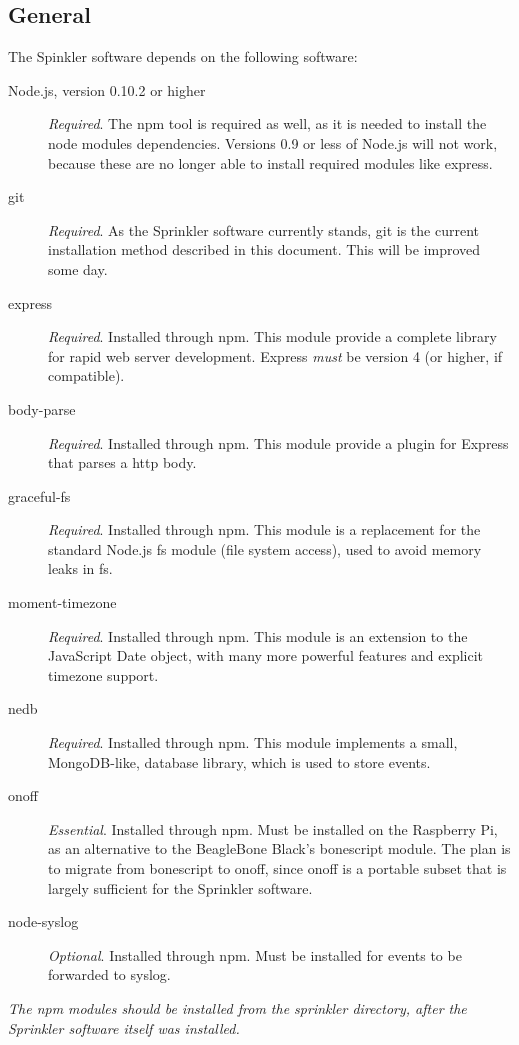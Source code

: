 \documentclass[11pt]{book}
\begin{document}
\subsection{General}
The Spinkler software depends on the following software:
\begin{description}
\item[Node.js, version 0.10.2 or higher] \emph{Required}. The npm tool is required as well, as it is needed to install the node modules dependencies. Versions 0.9 or less of Node.js will not work, because these are no longer able to install required modules like express.
\item[git] \emph{Required}. As the Sprinkler software currently stands, git is the current installation method described in this document. This will be improved some day.
\item[express] \emph{Required}. Installed through npm. This module provide a complete library for rapid web server development. Express \emph{must} be version 4 (or higher, if compatible).
\item[body-parse] \emph{Required}. Installed through npm. This module provide a plugin for Express that parses a http body.
\item[graceful-fs] \emph{Required}. Installed through npm. This module is a replacement for the standard Node.js fs module (file system access), used to avoid memory leaks in fs.
\item[moment-timezone] \emph{Required}. Installed through npm. This module is an extension to the JavaScript Date object, with many more powerful features and explicit timezone support.
\item[nedb] \emph{Required}. Installed through npm. This module implements a small, MongoDB-like, database library, which is used to store events.
\item[onoff] \emph{Essential}. Installed through npm. Must be installed on the Raspberry Pi, as an alternative to the BeagleBone Black's bonescript module. The plan is to migrate from bonescript to onoff, since onoff is a portable subset that is largely sufficient for the Sprinkler software.
\item[node-syslog] \emph{Optional}. Installed through npm. Must be installed for events to be forwarded to syslog. 
\end{description}
\emph{The npm modules should be installed from the sprinkler directory, after the Sprinkler software itself was installed.}
\end{document}
